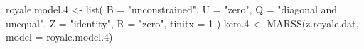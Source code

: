 \begin{Schunk}
\begin{Sinput}
 royale.model.4 <- list(
   B = "unconstrained", U = "zero", Q = "diagonal and unequal",
   Z = "identity", R = "zero", tinitx = 1
 )
 kem.4 <- MARSS(z.royale.dat, model = royale.model.4)
\end{Sinput}
\end{Schunk}
